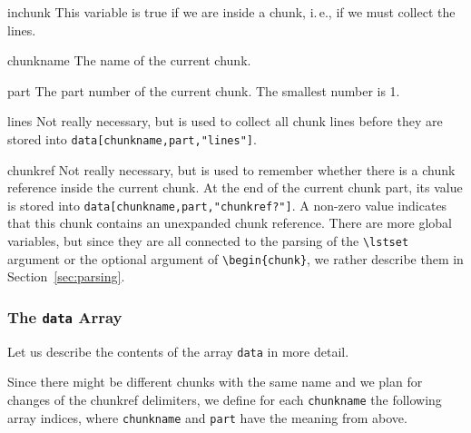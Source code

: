 \documentclass[a4paper]{article} %
\newcommand{\ie}{i.\,e.}
\newenvironment{ttdescription}
  {\list{}{\labelwidth0pt \itemindent-\leftmargin
      \def\makelabel##1{\hspace\labelsep
        \normalfont\ttfamily ##1:}}}
  {\endlist}
\begin{document}
\begin{ttdescription}
\item[inchunk] This variable is true if we are inside a chunk, \ie, if
  we must collect the lines.

\item[chunkname] The name of the current chunk.

\item[part] The part number of the current chunk. The smallest number
  is 1.

\item[lines] Not really necessary, but is used to collect all chunk
  lines before they are stored into
  \texttt{data[chunkname,part,"lines"]}.

\item[chunkref] Not really necessary, but is used to remember whether
  there is a chunk reference inside the current chunk. At the end of
  the current chunk part, its value is stored into
  \texttt{data[chunkname,part,"chunkref?"]}.
%
  A non-zero value indicates that this chunk contains an unexpanded
  chunk reference.
\end{ttdescription}
There are more global variables, but since they are all connected to
the parsing of the \verb'\lstset' argument or the optional argument of
\verb'\'\verb'begin{chunk}', we rather describe them in
Section~\ref{sec:parsing}.


\subsubsection{The \texttt{data} Array}
Let us describe the contents of the array \texttt{data} in more
detail.

Since there might be different chunks with the same name and we plan
for changes of the chunkref delimiters, we define for each
\texttt{chunkname} the following array indices, where
\texttt{chunkname} and \texttt{part} have the meaning from above.
\end{document}
